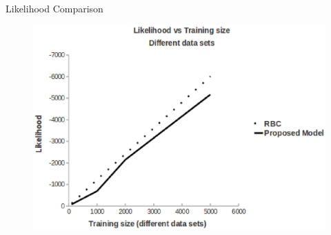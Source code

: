 \documentclass[10pt, blue,subsection=true, compress]{beamer}
\begin{document}
\begin{frame}
\begin{columns}[t]
\begin{block}{Likelihood Comparison}
\begin{figure}[htbp]
\centering
\includegraphics[scale=0.25]{img/ex1-lh.eps}
\label{fig:4.2}
\end{figure}
\end{block}
\end{columns}
\end{frame}
\end{document}
